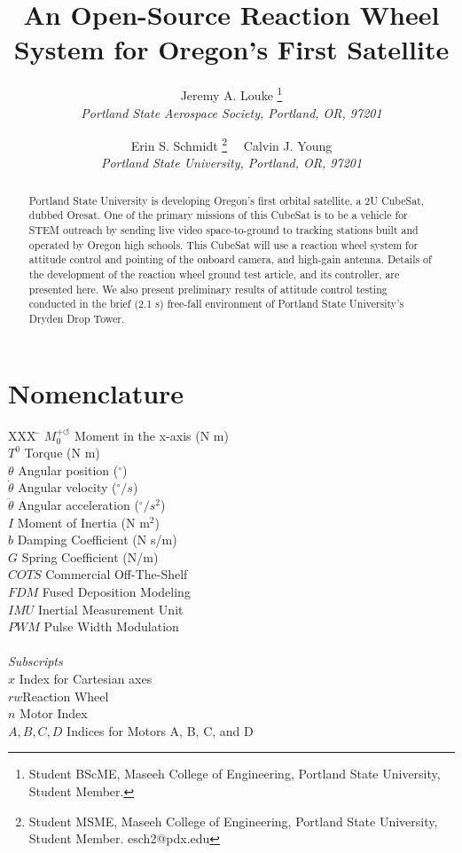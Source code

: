 \documentclass[]{aiaa-tc}%
\title{An Open-Source Reaction Wheel System for Oregon's First Satellite}
\author{
  Jeremy A. Louke%
  	\thanks{Student BScME, Maseeh College of Engineering, Portland State University, Student Member.}\\
  {\normalsize\itshape
   Portland State Aerospace Society, Portland, OR, 97201}\\
  \and
  Erin S. Schmidt%
  	\thanks{Student MSME, Maseeh College of Engineering, Portland State University, Student Member. esch2@pdx.edu} \ \
  Calvin J. Young\thanksibid{1}\\
  {\normalsize\itshape
  Portland State University, Portland, OR, 97201}
 }
\begin{document}
\maketitle

\begin{abstract}
Portland State University is developing Oregon's first orbital satellite, a 2U CubeSat, dubbed Oresat. One of the primary missions of this CubeSat is to be a vehicle for STEM outreach by sending live video space-to-ground to tracking stations built and operated by Oregon high schools. This CubeSat will use a reaction wheel system for attitude control and pointing of the onboard camera, and high-gain antenna. Details of the development of the reaction wheel ground test article, and its controller, are presented here. We also present preliminary results of attitude control testing conducted in the brief (2.1 s) free-fall environment of Portland State University's Dryden Drop Tower. 
\end{abstract}

\section*{Nomenclature}

\begin{center}
\parbox{0cm}
{\begin{tabbing}
  XXX \= \kill%
  $M_0^{+ \circlearrowleft}$ \qquad Moment in the x-axis (N m)\\
  $T^0$ \qquad Torque (N m)\\
  $\theta$ \qquad Angular position (${}^{\circ}$)\\
  $\dot{\theta}$ \qquad Angular velocity (${}^{\circ}/s$)\\ 
  $\ddot{\theta}$ \qquad Angular acceleration (${}^{\circ}/s^2$) \\
  $I$ \qquad Moment of Inertia (N $\textrm{m}^2$)\\
  $b$ \qquad Damping Coefficient (N s/m)\\ 
  $G$ \qquad Spring Coefficient (N/m)\\
  $COTS$ \qquad Commercial Off-The-Shelf\\
  $FDM$ \qquad Fused Deposition Modeling\\
  $IMU$ \qquad Inertial Measurement Unit\\
  $PWM$ \qquad Pulse Width Modulation\\ \\
  \textit{Subscripts}\\
  $x$ \qquad Index for Cartesian axes \\
  $rw$\qquad Reaction Wheel\\
  $n$ \qquad Motor Index\\
  $A, B, C, D$ \qquad Indices for Motors A, B, C, and D\\
 \end{tabbing}}
 \end{center}
 
\end{document}
